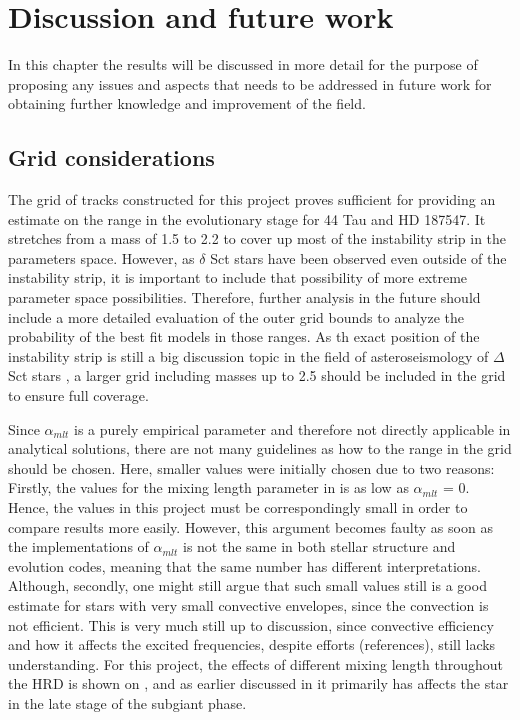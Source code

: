 \chapter{Discussion and future work}
\label{sec:discussion}

In this chapter the results will be discussed in more detail for the purpose of proposing any issues and aspects that needs to be addressed in future work for obtaining further knowledge and improvement of the field. 

\section{Grid considerations}

The grid of tracks constructed for this project proves sufficient for providing an estimate on the range in the evolutionary stage for 44 Tau and HD 187547. It stretches from a mass of 1.5 to 2.2 \msun to cover up most of the instability strip in the parameters space. However, as $\delta$ Sct stars have been observed even outside of the instability strip, it is important to include that possibility of more extreme parameter space possibilities. Therefore, further analysis in the future should include a more detailed evaluation of the outer grid bounds to analyze the probability of the best fit models in those ranges. As th exact position of the instability strip is still a big discussion topic in the field of asteroseismology of $\Delta$ Sct stars \citep{murphy2019gaia}, a larger grid including masses up to 2.5 \msun should be included in the grid to ensure full coverage. 

Since $\alpha_{mlt}$ is a purely empirical parameter and therefore not directly applicable in analytical solutions, there are not many guidelines as how to the range in the grid should be chosen. Here, smaller values were initially chosen due to two reasons: Firstly, the values for the mixing length parameter in \citep{lenz2010delta} is as low as $\alpha_{mlt}$ = 0. Hence, the values in this project must be correspondingly small in order to compare results more easily. However, this argument becomes faulty as soon as the implementations of $\alpha_{mlt}$ is not the same in both stellar structure and evolution codes, meaning that the same number has different interpretations. Although, secondly, one might still argue that such small values still is a good estimate for stars with very small convective envelopes, since the convection is not efficient. This is very much still up to discussion, since convective efficiency and how it affects the excited frequencies, despite efforts (references), still lacks understanding. For this project, the effects of different mixing length throughout the HRD is shown on , and as earlier discussed in  it primarily has affects the star in the late stage of the subgiant phase. 


